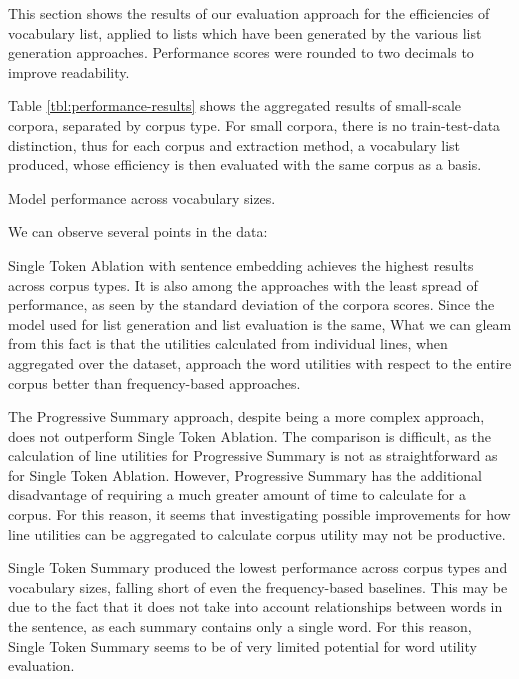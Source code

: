 This section shows the results of our evaluation approach for the efficiencies of vocabulary list, applied to lists which have been generated by the various list generation approaches.
Performance scores were rounded to two decimals to improve readability.


Table \ref{tbl:performance-results} shows the aggregated results of small-scale corpora, separated by corpus type.
For small corpora, there is no train-test-data distinction, thus for each corpus and extraction method, a vocabulary list produced, whose efficiency is then evaluated with the same corpus as a basis.

\begin{table}[ht]
	\centering
	
	\caption{Model performance across vocabulary sizes.}
	\label{tbl:performance-results}
\end{table}

We can observe several points in the data:

Single Token Ablation with sentence embedding achieves the highest results across corpus types.
It is also among the approaches with the least spread of performance, as seen by the standard deviation of the corpora scores.
Since the model used for list generation and list evaluation is the same,
What we can gleam from this fact is that the utilities calculated from individual lines, when aggregated over the dataset, approach the word utilities with respect to the entire corpus better than frequency-based approaches.

The Progressive Summary approach, despite being a more complex approach, does not outperform Single Token Ablation.
The comparison is difficult, as the calculation of line utilities for Progressive Summary is not as straightforward as for Single Token Ablation.
However, Progressive Summary has the additional disadvantage of requiring a much greater amount of time to calculate for a corpus.
For this reason, it seems that investigating possible improvements for how line utilities can be aggregated to calculate corpus utility may not be productive.

Single Token Summary produced the lowest performance across corpus types and vocabulary sizes, falling short of even the frequency-based baselines.
This may be due to the fact that it does not take into account relationships between words in the sentence, as each summary contains only a single word.
For this reason, Single Token Summary seems to be of very limited potential for word utility evaluation.

